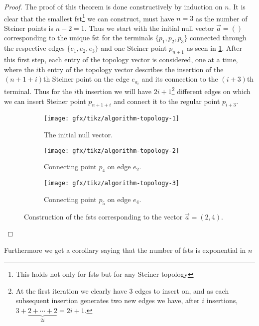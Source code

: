 \begin{proof}
The proof of this theorem is done constructively by induction on $n$. It is
clear that the smallest \ac{fst}\footnote{This holds not only for \acp{fst}
  but for any Steiner topology} we can construct, must have $n = 3$ as the
number of Steiner points is $n - 2 = 1$. Thus we start with the initial null
vector $\vec{a} = ()$ corresponding to the unique \ac{fst} for the terminals
$\{p_1, p_2, p_3\}$ connected through the respective edges $\{e_1, e_2, e_3\}$ and one
Steiner point $p_{n+1}$ as seen in \cref{fig:algorithm-topology-1}. After this
first step, each entry of the topology vector is considered, one at a time,
where the $i$th entry of the topology vector describes the insertion of the
$(n+1+i)$th Steiner point on the edge $e_{a_{i}}$ and its connection to the
$(i+3)$th terminal. Thus for the $i$th insertion we will have
$2i+1$\footnote{At the first iteration we clearly have $3$ edges to insert on, and
  as each subsequent insertion generates two new edges we have, after $i$
  insertions, $3 + \underbrace{2 + \cdots + 2}_{2 i} = 2 i + 1$.} different
edges on which we can insert Steiner point $p_{n + 1 + i}$ and connect it to the
regular point $p_{i+3}$.
%
\begin{figure}[htbp] \centering
  \begin{subfigure}[t]{0.267\textwidth}
    \texttt{[image: gfx/tikz/algorithm-topology-1]}
    \caption{The initial null vector.\label{fig:algorithm-topology-1}}
  \end{subfigure}\hspace{1em}%
  \begin{subfigure}[t]{0.267\textwidth}
    \texttt{[image: gfx/tikz/algorithm-topology-2]}
    \caption{Connecting point $p_4$ on edge $e_2$.\label{fig:algorithm-topology-2}}
  \end{subfigure}\hspace{1em}%
  \begin{subfigure}[t]{0.267\textwidth}
    \texttt{[image: gfx/tikz/algorithm-topology-3]}
    \caption{Connecting point $p_5$ on edge $e_4$.\label{fig:algorithm-topology-3}}
  \end{subfigure}
  \caption[Construction of FSTs]{Construction of the \acp{fst} corresponding
to the vector $\vec{a} = (2, 4)$.\label{fig:algorithm-topologies}}
\end{figure}
\end{proof}

Furthermore we get a corollary saying that the number of \acp{fst} is
exponential in $n$

